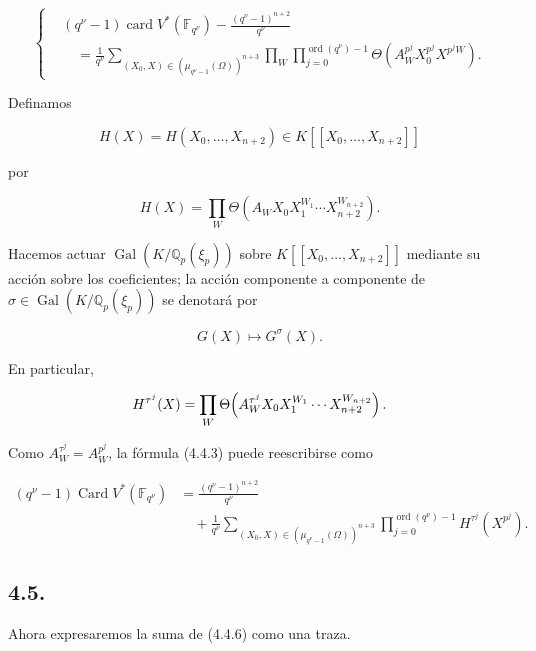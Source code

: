\begin{equation}\tag{4.4.3}
\left\{
\begin{aligned}
&(q^\nu-1)\operatorname{card}V^*(\mathbb F_{q^\nu})
-\frac{(q^\nu-1)^{n+2}}{q^\nu}\\
&\quad=\frac1{q^\nu}
\sum_{(X_0,X)\in(\mu_{q^\nu-1}(\Omega))^{n+3}}
\prod_W\prod_{j=0}^{\operatorname{ord}(q^\nu)-1}
\Theta\!\left(A_W^{p^j}X_0^{p^j}X^{p^jW}\right).
\end{aligned}
\right.
\end{equation}

Definamos

\[
H(X)=H(X_0,\ldots,X_{n+2})\in K[[X_0,\ldots,X_{n+2}]]
\]

por

\begin{equation}\tag{4.4.4}
H(X)=\prod_W
\Theta\!\left(A_WX_0X_1^{W_1}\cdots X_{n+2}^{W_{n+2}}\right).
\end{equation}

Hacemos actuar $\operatorname{Gal}(K/\mathbb Q_p(\xi_p))$ sobre
$K[[X_0,\ldots,X_{n+2}]]$ mediante su acción sobre los coeficientes; la
acción componente a componente de
$\sigma\in\operatorname{Gal}(K/\mathbb Q_p(\xi_p))$ se denotará por

\begin{equation}\tag{4.4.5}
G(X)\longmapsto G^\sigma(X).
\end{equation}

\pageoriginale

En particular,

\[
H^{\tau^j}(X)=\prod_W
\Theta\!\left(A_W^{\tau^j}X_0X_1^{\sisi{W}{W_1}}\cdots
X_{n+2}^{W_{n+2}}\right).
\]

Como $A_W^{\tau^j}=A_W^{p^j}$, la fórmula (4.4.3) puede reescribirse
como

\begin{equation}\tag{4.4.6}
\begin{aligned}
(q^\nu-1)\operatorname{Card}V^*(\mathbb F_{q^\nu})
&=\frac{(q^\nu-1)^{n+2}}{q^\nu}\\
&\quad+\frac1{q^\nu}
\sum_{(X_0,X)\in(\mu_{q^\nu-1}(\Omega))^{n+3}}
\prod_{j=0}^{\operatorname{ord}(q^\nu)-1}H^{\tau^j}(X^{p^j}).
\end{aligned}
\end{equation}

\subsection*{4.5.}
Ahora expresaremos la suma de (4.4.6) como una traza.

